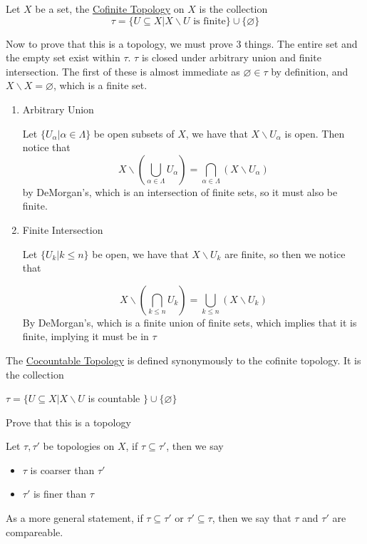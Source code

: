 \begin{definition}
    Let $X$ be a set, the \href{https://en.wikipedia.org/wiki/Cofiniteness#Cofinite_topology}{Cofinite Topology} on $X$ is the collection
    \[\tau=\{U\subseteq X\vert X\backslash U\text{ is finite}\}\cup\{\varnothing\}\]    
\end{definition}
Now to prove that this is a topology, we must prove 3 things. The entire set and the empty set exist within $\tau$. $\tau$ is closed under arbitrary union and finite intersection. The first of these is almost immediate as $\varnothing\in\tau$ by definition, and $X\backslash X=\varnothing$, which is a finite set.
\begin{enumerate}
    \item Arbitrary Union
    
    Let $\{U_\alpha\vert\alpha\in\Lambda\}$ be open subsets of $X$, we have that $X\backslash U_\alpha$ is open. Then notice that \[X\backslash\left(\bigcup_{\alpha\in\Lambda}U_\alpha\right) = \bigcap_{\alpha\in\Lambda}\left(X\backslash U_\alpha\right)\]
    by DeMorgan's, which is an intersection of finite sets, so it must also be finite.
    \item Finite Intersection
    
    Let $\{U_k\vert k\leq n\}$ be open, we have that $X\backslash U_k$ are finite, so then we notice that
    
    \[X\backslash\left(\bigcap_{k\leq n}U_k\right) = \bigcup_{k\leq n}\left(X\backslash U_k\right)\]
    By DeMorgan's, which is a finite union of finite sets, which implies that it is finite, implying it must be in $\tau$
\end{enumerate}
\begin{definition}
    The \href{https://en.wikipedia.org/wiki/Cocountable_topology}{Cocountable Topology} is defined synonymously to the cofinite topology. It is the collection 
    \begin{center}
        $\tau=\{U\subseteq X\vert X\backslash U$ is countable $\}\cup\{\varnothing\}$
    \end{center}
\end{definition}
Prove that this is a topology
\begin{definition}
    Let $\tau,\tau'$ be topologies on $X$, if $\tau\subseteq\tau'$, then we say 
    \begin{itemize}
        \item $\tau$ is coarser than $\tau'$
        \item $\tau'$ is finer than $\tau$
    \end{itemize}
    As a more general statement, if $\tau\subseteq\tau'$ or $\tau'\subseteq\tau$, then we say that $\tau$ and $\tau'$ are compareable.
\end{definition}
